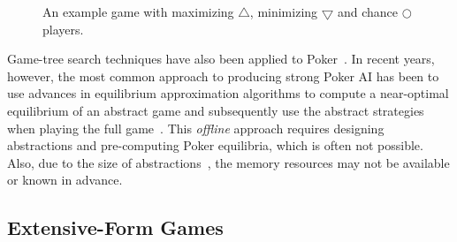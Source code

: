 \documentclass[letterpaper]{article}
\begin{document}
\begin{figure}
\begin{center}
\end{center}
\caption{An example game with maximizing $\bigtriangleup$, minimizing $\bigtriangledown$ and chance $\bigcirc$ players.}\label{fig:coordGame}
\end{figure}




Game-tree search techniques have also been applied to Poker~\cite{Billings04Game}. In recent years, however, 
the most common approach to producing strong Poker AI has been to use advances in equilibrium approximation 
algorithms to compute a near-optimal equilibrium of an abstract game and subsequently use the abstract strategies 
when playing the full game~\cite{Sandholm10The}. This {\it offline} approach requires designing 
abstractions and pre-computing Poker equilibria, which is often not possible. Also, due to the size of 
abstractions~\cite{Johanson13Evaluating}, the memory resources may not be available or known in advance. 

\subsection{Extensive-Form Games}

\end{document}

